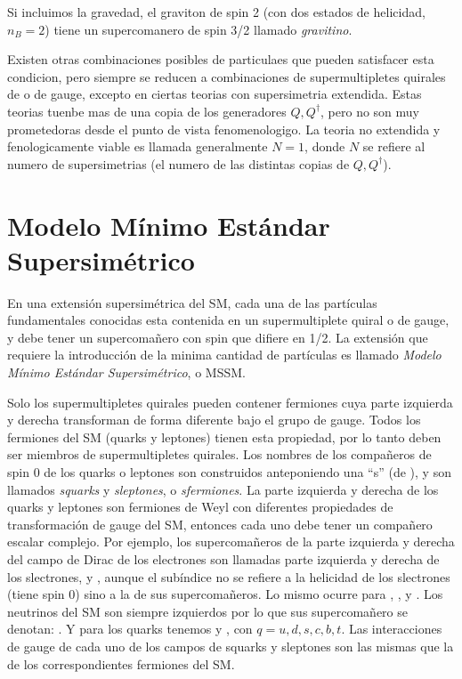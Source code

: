 Si incluimos la gravedad, el graviton de spin 2 (con dos estados de helicidad, $n_B=2$)
tiene un supercomanero de spin 3/2 llamado \emph{gravitino}.

Existen otras combinaciones posibles de particulaes que pueden satisfacer esta
condicion, pero siempre se reducen a combinaciones de supermultipletes quirales
de o de gauge, excepto en ciertas teorias con supersimetria extendida. Estas
teorias tuenbe mas de una copia de los generadores $Q, Q^\dagger$, pero no son
muy prometedoras desde el punto de vista fenomenologigo.
La teoria no extendida y fenologicamente viable es llamada generalmente $N=1$,
donde $N$ se refiere al numero de supersimetrias (el numero de las distintas
copias de $Q,Q^\dagger$).


\section{Modelo Mínimo Estándar Supersimétrico}

En una extensión supersimétrica del SM, cada una de las partículas fundamentales
conocidas esta contenida en un supermultiplete quiral o de gauge, y debe tener
un supercoma\~nero con spin que difiere en 1/2.
La extensión que requiere la introducci\'on de la minima cantidad de
partículas es llamado \emph{Modelo Mínimo Estándar Supersimétrico}, o MSSM.


Solo los supermultipletes quirales pueden contener fermiones cuya parte izquierda
y derecha transforman de forma diferente bajo el grupo de gauge.
Todos los fermiones del SM (quarks y leptones) tienen esta propiedad,
por lo tanto deben ser miembros de supermultipletes quirales.
Los nombres de los compañeros de spin 0 de los quarks o leptones son construidos
anteponiendo una ``s'' (de ), y son llamados \emph{squarks}
y \emph{sleptones}, o \emph{sfermiones}.
La parte izquierda y derecha de los quarks y leptones son fermiones de Weyl
con diferentes propiedades de transformación de gauge del SM, entonces cada
uno debe tener un compañero escalar complejo.
Por ejemplo, los supercomañeros de la parte izquierda y derecha del campo
de Dirac de los electrones son llamadas parte izquierda y derecha de los
slectrones, {\selL} y {\selR}, aunque el subíndice no se refiere a la
helicidad de los slectrones (tiene spin 0) sino a la de sus supercomañeros.
Lo mismo ocurre para {\smuL}, {\smuR}, {\stauL} y {\stauR}. Los neutrinos
del SM son siempre izquierdos por lo que sus supercomañero se denotan:
{\snu}. Y para los quarks tenemos {\squarkL} y {\squarkR}, con $q = u, d, s, c, b, t$.
Las interacciones de gauge de cada uno de los campos de squarks y sleptones
son las mismas que la de los correspondientes fermiones del SM.


